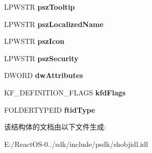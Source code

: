 \begin{DoxyCompactItemize}
\item 
\mbox{\label{structtag_k_n_o_w_n_f_o_l_d_e_r___d_e_f_i_n_i_t_i_o_n_a0a82e6bbe844e0d4c75c9f3bdb6d5d2c}} 
L\+P\+W\+S\+TR {\bfseries psz\+Tooltip}
\item 
\mbox{\label{structtag_k_n_o_w_n_f_o_l_d_e_r___d_e_f_i_n_i_t_i_o_n_a0b2a1de1ac4c6761a6e1103a65b5a471}} 
L\+P\+W\+S\+TR {\bfseries psz\+Localized\+Name}
\item 
\mbox{\label{structtag_k_n_o_w_n_f_o_l_d_e_r___d_e_f_i_n_i_t_i_o_n_a6c8aca1aec6c149cf86cfe43c9f339f8}} 
L\+P\+W\+S\+TR {\bfseries psz\+Icon}
\item 
\mbox{\label{structtag_k_n_o_w_n_f_o_l_d_e_r___d_e_f_i_n_i_t_i_o_n_a86498408ed2f3917460e50ff03aabf3e}} 
L\+P\+W\+S\+TR {\bfseries psz\+Security}
\item 
\mbox{\label{structtag_k_n_o_w_n_f_o_l_d_e_r___d_e_f_i_n_i_t_i_o_n_a3c2978bbde26cf9ac98021440d14439d}} 
D\+W\+O\+RD {\bfseries dw\+Attributes}
\item 
\mbox{\label{structtag_k_n_o_w_n_f_o_l_d_e_r___d_e_f_i_n_i_t_i_o_n_a3ad6c51c9627083aaad391aa0adf6bfc}} 
K\+F\+\_\+\+D\+E\+F\+I\+N\+I\+T\+I\+O\+N\+\_\+\+F\+L\+A\+GS {\bfseries kfd\+Flags}
\item 
\mbox{\label{structtag_k_n_o_w_n_f_o_l_d_e_r___d_e_f_i_n_i_t_i_o_n_adb4a0005de2f01e8d9f89ae16ea3b4fd}} 
F\+O\+L\+D\+E\+R\+T\+Y\+P\+E\+ID {\bfseries ftid\+Type}
\end{DoxyCompactItemize}


该结构体的文档由以下文件生成\+:\begin{DoxyCompactItemize}
\item 
E\+:/\+React\+O\+S-\/0../sdk/include/psdk/shobjidl.\+idl\end{DoxyCompactItemize}

